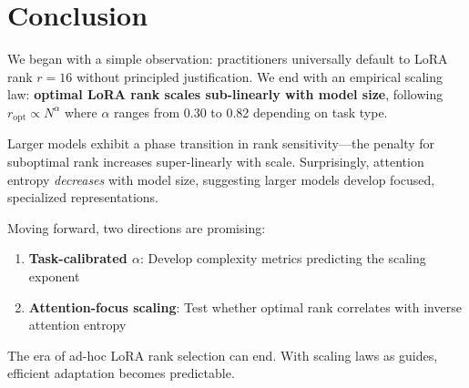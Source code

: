 \section{Conclusion}

We began with a simple observation: practitioners universally default to LoRA rank $r=16$ without principled justification. We end with an empirical scaling law: \textbf{optimal LoRA rank scales sub-linearly with model size}, following $r_{\text{opt}} \propto N^\alpha$ where $\alpha$ ranges from 0.30 to 0.82 depending on task type.

Larger models exhibit a phase transition in rank sensitivity---the penalty for suboptimal rank increases super-linearly with scale. Surprisingly, attention entropy \emph{decreases} with model size, suggesting larger models develop focused, specialized representations.

Moving forward, two directions are promising:
\begin{enumerate}
    \item \textbf{Task-calibrated $\alpha$}: Develop complexity metrics predicting the scaling exponent
    \item \textbf{Attention-focus scaling}: Test whether optimal rank correlates with inverse attention entropy
\end{enumerate}

The era of ad-hoc LoRA rank selection can end. With scaling laws as guides, efficient adaptation becomes predictable.
